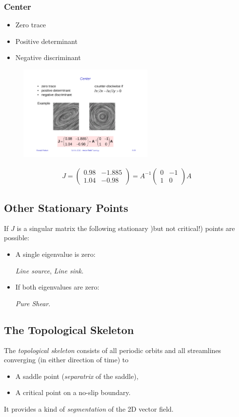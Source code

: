 \subsubsection{Center}
\begin{itemize}
    \item Zero trace
    \item Positive determinant
    \item Negative discriminant
\end{itemize}
\begin{figure}[H]
    \centering
    \includegraphics[width=0.6\textwidth]{img/08_center_point}
\end{figure}
\begin{align*}
J = \begin{pmatrix}
     0.98 & -1.885\\
     1.04 & -0.98
 \end{pmatrix}
 = A ^{-1} 
     \begin{pmatrix}
         0 & -1\\
         1 & 0
     \end{pmatrix}A
\end{align*}
\subsection{Other Stationary Points}
If $J$ is a singular matrix the following stationary )but not critical!) points are possible:
\begin{itemize}
    \item A single eigenvalue is zero:
    
        \emph{Line source}, \emph{Line sink}.
    \item If both eigenvalues are zero:
        
        \emph{Pure Shear}.
\end{itemize}

\subsection{The Topological Skeleton}
The \emph{topological skeleton} consists of all periodic orbits and all streamlines converging (in either direction of time) to
\begin{itemize}
    \item A saddle point (\emph{separatrix} of the saddle),
    \item A  critical point on a no-slip boundary.
\end{itemize}
It provides a kind of \emph{segmentation} of the 2D vector field.

